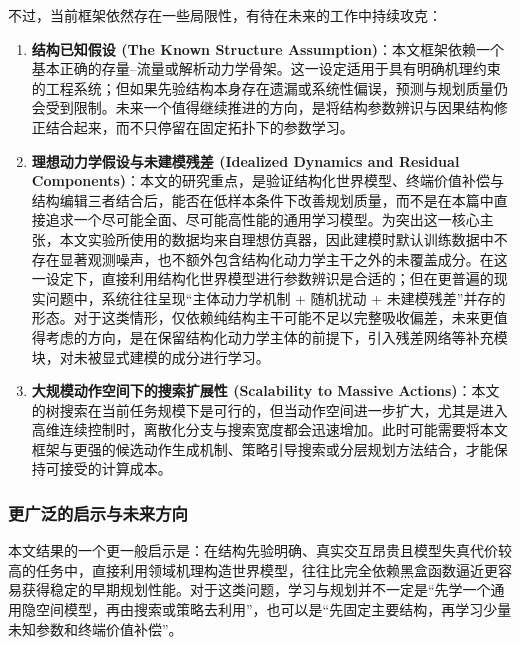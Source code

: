 \documentclass[UTF8]{ctexart}
\begin{document}
不过，当前框架依然存在一些局限性，有待在未来的工作中持续攻克：

\begin{enumerate}
\item \textbf{结构已知假设 (The Known Structure Assumption)}：本文框架依赖一个基本正确的存量--流量或解析动力学骨架。这一设定适用于具有明确机理约束的工程系统；但如果先验结构本身存在遗漏或系统性偏误，预测与规划质量仍会受到限制。未来一个值得继续推进的方向，是将结构参数辨识与因果结构修正结合起来，而不只停留在固定拓扑下的参数学习。
\item \textbf{理想动力学假设与未建模残差 (Idealized Dynamics and Residual Components)}：本文的研究重点，是验证结构化世界模型、终端价值补偿与结构编辑三者结合后，能否在低样本条件下改善规划质量，而不是在本篇中直接追求一个尽可能全面、尽可能高性能的通用学习模型。为突出这一核心主张，本文实验所使用的数据均来自理想仿真器，因此建模时默认训练数据中不存在显著观测噪声，也不额外包含结构化动力学主干之外的未覆盖成分。在这一设定下，直接利用结构化世界模型进行参数辨识是合适的；但在更普遍的现实问题中，系统往往呈现“主体动力学机制 + 随机扰动 + 未建模残差”并存的形态。对于这类情形，仅依赖纯结构主干可能不足以完整吸收偏差，未来更值得考虑的方向，是在保留结构化动力学主体的前提下，引入残差网络等补充模块，对未被显式建模的成分进行学习。
\item \textbf{大规模动作空间下的搜索扩展性 (Scalability to Massive Actions)}：本文的树搜索在当前任务规模下是可行的，但当动作空间进一步扩大，尤其是进入高维连续控制时，离散化分支与搜索宽度都会迅速增加。此时可能需要将本文框架与更强的候选动作生成机制、策略引导搜索或分层规划方法结合，才能保持可接受的计算成本。
\end{enumerate}

\hypertarget{ux5e7fux4e49-neuro-orux4e0bux4e00ux4e2aux524dux6cbf-towards-generalized-neuro-or}{%
\subsubsection{更广泛的启示与未来方向}\label{ux5e7fux4e49-neuro-orux4e0bux4e00ux4e2aux524dux6cbf-towards-generalized-neuro-or}}

本文结果的一个更一般启示是：在结构先验明确、真实交互昂贵且模型失真代价较高的任务中，直接利用领域机理构造世界模型，往往比完全依赖黑盒函数逼近更容易获得稳定的早期规划性能。对于这类问题，学习与规划并不一定是“先学一个通用隐空间模型，再由搜索或策略去利用”，也可以是“先固定主要结构，再学习少量未知参数和终端价值补偿”。
\end{document}
